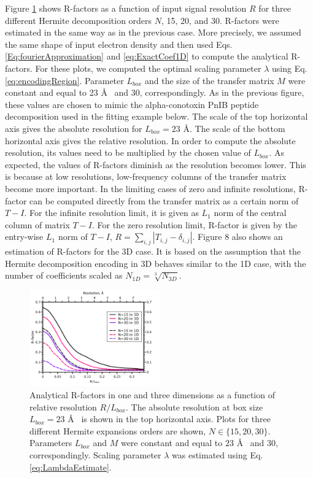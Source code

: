 Figure \ref{fig:RfactorsVsResolution} shows R-factors as a function of input signal resolution $R$ for three different Hermite decomposition orders $N$, 15, 20, and 30.
R-factors were estimated in the same way as in the previous case. 
More precisely, we assumed the same shape of input electron density and then used Eqs. \ref{Eq:fourierApproximation} and \ref{eq:ExactCoef1D} to compute the analytical R-factors. For these plots, we computed the optimal scaling parameter $\lambda$ using Eq. \ref{eq:encodingRegion}.
Parameter $L_{box}$ and the size of the transfer matrix $M$ were constant and equal to 23 \AA~ and $30$, correspondingly. As in the previous figure, these values are chosen to mimic
the alpha-conotoxin PnIB peptide decomposition used in the fitting example below.
%
The scale of the top horizontal axis gives the absolute resolution for $L_{box}=23$ \AA. The scale of the bottom horizontal axis gives  the relative resolution. In order to compute the absolute resolution, its values need to be multiplied by the chosen value of  $L_{box}$.
As expected, the values of R-factors diminish as the resolution becomes lower. This is because at low resolutions, low-frequency columns of the transfer matrix become more important.
In the limiting cases of zero and infinite resolutions, R-factor can be computed directly from the transfer matrix as a certain norm of $T-I$. For the infinite resolution limit, it is given as $L_1$ norm of the central column of matrix $T-I$. For the zero resolution limit, R-factor is given by the entry-wise $L_1$ norm of $T-I$, $R=\sum_{i,j}|T_{i,j}-\delta_{i,j}|$.
%
Figure 8 also shows an estimation of R-factors for the 3D case. It is based on the assumption that  the Hermite decomposition encoding in 
3D behaves similar to the 1D case, with the number of coefficients scaled as $N_{1D} = \sqrt[3]{N_{3D}}$.

\begin{figure}[H]
\label{fig:RfactorsVsResolution}
\begin{centering}
\includegraphics[width=0.5\textwidth]{Hermite/Fig/RfactorVsResolution_DiffAlphas.pdf}
\par\end{centering}
\caption[R-factors in one and three dimensions]{Analytical R-factors in one and three dimensions as a function of  relative resolution $R/L_{box}$. 
The absolute resolution at box size $L_{box}=23$ \AA~ is shown in the top horizontal axis.
Plots for three different Hermite expansions orders are shown, $N\in\{15,20,30\}$.
Parameters $L_{box}$ and $M$ were constant and equal to $23$ \AA~ and $30$, correspondingly. Scaling parameter $\lambda$ was estimated 
using  Eq. \ref{eq:LambdaEstimate}. }
\end{figure}

